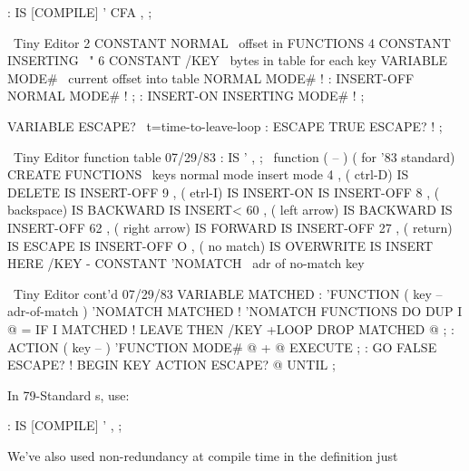 \begin{Code}
: IS   [COMPILE] '  CFA , ;
\end{Code}
\begin{figure*}[tttp]
\setcounter{screen}{30}
\begin{Screen}
\ Tiny Editor
2 CONSTANT NORMAL     \ offset in FUNCTIONS
4 CONSTANT INSERTING  \        "
6 CONSTANT /KEY       \ bytes in table for each key
VARIABLE MODE#        \ current offset into table
NORMAL MODE# !
: INSERT-OFF   NORMAL    MODE# ! ;
: INSERT-ON    INSERTING MODE# ! ;

VARIABLE ESCAPE?      \ t=time-to-leave-loop
: ESCAPE  TRUE ESCAPE? ! ;





\end{Screen}
\begin{Screen}
\ Tiny Editor             function table             07/29/83
: IS   ' , ;  \   function   ( -- )    ( for '83 standard)
CREATE FUNCTIONS
\ keys                  normal mode        insert mode
 4 ,  ( ctrl-D)         IS DELETE          IS INSERT-OFF
 9 ,  ( etrl-I)         IS INSERT-ON       IS INSERT-OFF
 8 ,  ( backspace)      IS BACKWARD        IS INSERT<
60 ,  ( left arrow)     IS BACKWARD        IS INSERT-OFF
62 ,  ( right arrow)    IS FORWARD         IS INSERT-OFF
27 ,  ( return)         IS ESCAPE          IS INSERT-OFF
 O ,  ( no match)       IS OVERWRITE       IS INSERT
HERE /KEY -  CONSTANT 'NOMATCH  \ adr of no-match key




\end{Screen}
\begin{Screen}
\ Tiny Editor cont'd                                 07/29/83
VARIABLE MATCHED
: 'FUNCTION  ( key -- adr-of-match )  'NOMATCH  MATCHED !
   'NOMATCH FUNCTIONS DO  DUP  I @ =  IF
     I MATCHED !  LEAVE  THEN  /KEY +LOOP  DROP
    MATCHED @ ;
: ACTION  ( key -- )  'FUNCTION  MODE# @ +  @ EXECUTE ;
: GO   FALSE ESCAPE? !  BEGIN  KEY ACTION  ESCAPE? @ UNTIL ;








\end{Screen}
\end{figure*}
In 79-Standard \Forth{}s, use:
\begin{Code}
: IS   [COMPILE] '  , ;
\end{Code}
We've also used non-redundancy at compile time in the definition just
